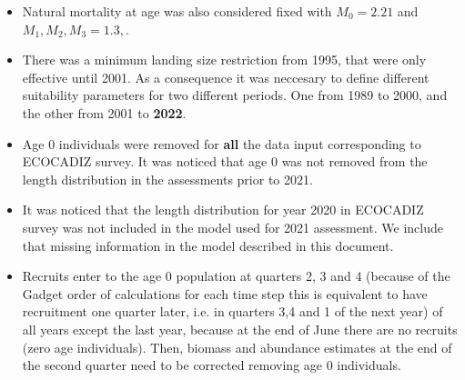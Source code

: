 \documentclass[review]{elsarticle}
\begin{document}
\begin{itemize}
\item Natural mortality at age was also considered fixed with $M_{0}=2.21$ and $M_{1},M_{2},M_{3}=1.3,$.  
\item There was a minimum landing size restriction from 1995, that were only effective until 2001. As a consequence it was neccesary to define different suitability parameters for two different periods. One from 1989 to 2000, and the other from 2001 to \textbf{2022}.
\item Age 0 individuals were removed for \textbf{all} the data input corresponding to ECOCADIZ survey. It was noticed that age 0 was not removed from the length distribution in the assessments prior to 2021.
\item It was noticed that the length distribution for year 2020 in ECOCADIZ survey was not included in the model used for 2021 assessment. We include that missing information in the model described in this document.
\item Recruits enter to the age 0 population at quarters 2, 3 and 4  (because of the Gadget order of calculations for each time step this is equivalent to have recruitment one quarter later, i.e. in quarters 3,4 and 1 of the next year) of all years except the last year, because at the end of June there are no recruits (zero age individuals). Then, biomass and abundance estimates at the end of the second quarter need to be corrected removing age 0 individuals.


\end{itemize}
\end{document}
